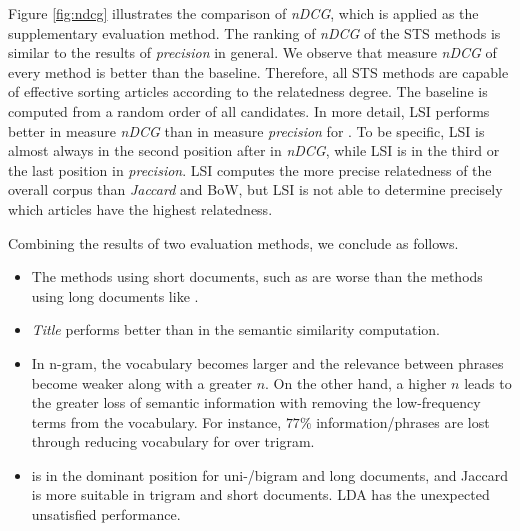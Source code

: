 Figure \ref{fig:ndcg} illustrates the comparison of \textit{nDCG}, which is applied as the supplementary evaluation method. The ranking of \textit{nDCG} of the STS methods is similar to the results of \textit{precision} in general. We observe that measure \textit{nDCG} of every method is better than the baseline. Therefore, all STS methods are capable of effective sorting articles according to the relatedness degree. The baseline is computed from a random order of all candidates. In more detail, LSI performs better in measure \textit{nDCG} than in measure \textit{precision} for \icontent{}. To be specific, LSI is almost always in the second position after \tfidf{} in \textit{nDCG}, while LSI is in the third or the last position in \textit{precision}. LSI computes the more precise relatedness of the overall corpus than \textit{Jaccard} and BoW, but LSI is not able to determine precisely which articles have the highest relatedness. 


Combining the results of two evaluation methods, we conclude as follows.

\begin{itemize}
\item The methods using short documents, such as \ititle{} are worse than the methods using long documents like \icontent{}. 

\item \textit{Title} performs better than \isummary{} in the semantic similarity computation.

\item In n-gram, the vocabulary becomes larger and the relevance between phrases become weaker along with a greater $n$. On the other hand, a higher $n$ leads to the greater loss of semantic information with removing the low-frequency terms from the vocabulary. For instance, $77\%$ information/phrases are lost through reducing vocabulary for \icontent{} over trigram. 

\item \tfidf{} is in the dominant position for uni-/bigram and long documents, and Jaccard is more suitable in trigram and short documents. LDA has the unexpected unsatisfied performance.
\end{itemize}
 

